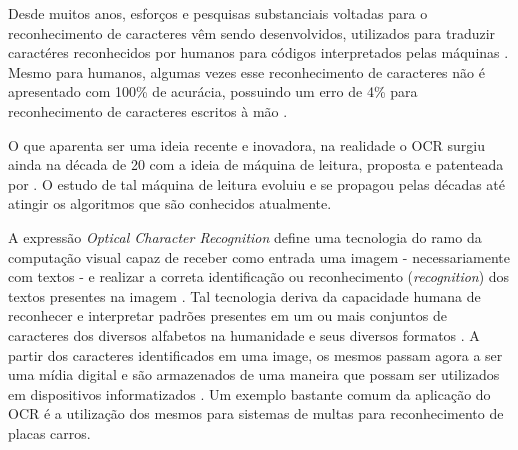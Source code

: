 Desde muitos anos, esforços e pesquisas substanciais voltadas para o reconhecimento de caracteres vêm sendo desenvolvidos, utilizados para traduzir caractéres reconhecidos por humanos para códigos interpretados pelas máquinas \cite{ocr-survey}. Mesmo para humanos, algumas vezes esse reconhecimento de caracteres não é apresentado com 100\% de acurácia, possuindo um erro de 4\% para reconhecimento de caracteres escritos à mão \cite{ocr-on-handprinted}.

O que aparenta ser uma ideia recente e inovadora, na realidade o OCR surgiu ainda na década de 20 com a ideia de máquina de leitura, proposta e patenteada por . O estudo de tal máquina de leitura evoluiu e se propagou pelas décadas até atingir os algoritmos que são conhecidos atualmente.

A expressão \textit{Optical Character Recognition} define uma tecnologia do ramo da computação visual capaz de receber como entrada uma imagem - necessariamente com textos - e realizar a correta identificação ou reconhecimento (\textit{recognition}) dos textos presentes na imagem \cite{ocr-survey}. Tal tecnologia deriva da capacidade humana de reconhecer e interpretar padrões presentes em um ou mais conjuntos de caracteres dos diversos alfabetos na humanidade e seus diversos formatos \cite{optical-char-recognition}. A partir dos caracteres identificados em uma image, os mesmos passam agora a ser uma mídia digital e são armazenados de uma maneira que possam ser utilizados em dispositivos informatizados \cite{optical-char-recognition}. Um exemplo bastante comum da aplicação do OCR é a utilização dos mesmos para sistemas de multas para reconhecimento de placas carros.

